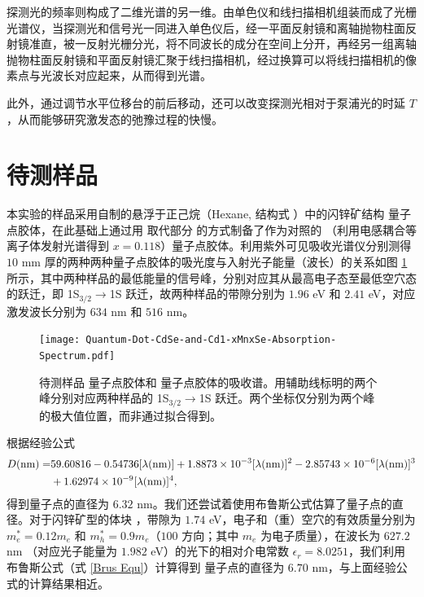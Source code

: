 \documentclass{thesis}
\begin{document}
探测光的频率则构成了二维光谱的另一维。由单色仪和线扫描相机组装而成了光栅光谱仪，当探测光和信号光一同进入单色仪后，经一平面反射镜和离轴抛物柱面反射镜准直，被一反射光栅分光，将不同波长的成分在空间上分开，再经另一组离轴抛物柱面反射镜和平面反射镜汇聚于线扫描相机，经过换算可以将线扫描相机的像素点与光波长对应起来，从而得到光谱。

此外，通过调节水平位移台的前后移动，还可以改变探测光相对于泵浦光的时延 $T$，从而能够研究激发态的弛豫过程的快慢。

\section{待测样品}
本实验的样品采用自制的悬浮于正己烷（Hexane, 结构式 ）中的闪锌矿结构  量子点胶体，在此基础上通过用  取代部分  的方式制备了作为对照的  （利用电感耦合等离子体发射光谱得到 $x=0.118$）量子点胶体。利用紫外可见吸收光谱仪分别测得 $10$ mm 厚的两种两种量子点胶体的吸光度与入射光子能量（波长）的关系如图 \ref{Absorption spectrum} 所示，其中两种样品的最低能量的信号峰，分别对应其从最高电子态至最低空穴态的跃迁，即 1S$_{3/2}\rightarrow$1S 跃迁，故两种样品的带隙分别为 $1.96$ eV 和 $2.41$ eV，对应激发波长分别为 $634$ nm 和 $516$ nm。

\begin{figure}[h]
    \centering
    \texttt{[image: Quantum-Dot-CdSe-and-Cd1-xMnxSe-Absorption-Spectrum.pdf]}
    \caption{待测样品  量子点胶体和  量子点胶体的吸收谱。用辅助线标明的两个峰分别对应两种样品的 1S$_{3/2}\rightarrow$1S 跃迁。两个坐标仅分别为两个峰的极大值位置，而非通过拟合得到。}
    \label{Absorption spectrum}
\end{figure}

根据经验公式\cite{jasieniak2009re}
\begin{align}
    \notag D(\text{nm})=&59.60816-0.54736[\lambda(\text{nm})]+1.8873\times 10^{-3}[\lambda(\text{nm})]^2-2.85743\times 10^{-6}[\lambda(\text{nm})]^3\\
    &+1.62974\times 10^{-9}[\lambda(\text{nm})]^4,
\end{align}
得到量子点的直径为 $6.32$ nm。我们还尝试着使用布鲁斯公式估算了量子点的直径。对于闪锌矿型的体块 ，带隙为 $1.74$ eV\cite{ninomiya1995optical,janowitz1994dielectric}，电子和（重）空穴的有效质量分别为 $m_e^*=0.12 m_e$ 和 $m_h^*=0.9 m_e$（$100$ 方向；其中 $m_e$ 为电子质量）\cite{kim1994optical}，在波长为 $627.2$ nm （对应光子能量为 $1.982$ eV）的光下的相对介电常数 $\epsilon_r=8.0251$\cite{reshak2006theoretical}，我们利用布鲁斯公式（式 \eqref{Brus Equ}）计算得到  量子点的直径为 $6.70$ nm，与上面经验公式的计算结果相近。
\end{document}
